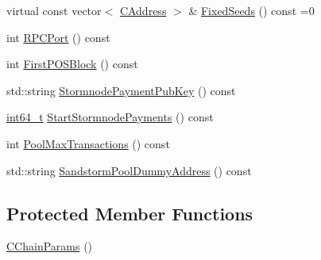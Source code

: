\begin{DoxyCompactItemize}
virtual const vector$<$ \hyperlink{class_c_address}{C\+Address} $>$ \& \hyperlink{class_c_chain_params_a9e09b643284669c2769663efe23488fb}{Fixed\+Seeds} () const =0
\item 
int \hyperlink{class_c_chain_params_ac6f1379c1948312e9577449e967d5224}{R\+P\+C\+Port} () const 
\item 
int \hyperlink{class_c_chain_params_a3cffb9a755e132d5f175bca6448fd13e}{First\+P\+O\+S\+Block} () const 
\item 
std\+::string \hyperlink{class_c_chain_params_af573655162ed0d9790bbf575e0f955b2}{Stormnode\+Payment\+Pub\+Key} () const 
\item 
\hyperlink{stdint_8h_adec1df1b8b51cb32b77e5b86fff46471}{int64\+\_\+t} \hyperlink{class_c_chain_params_a14a73174e170f4b7a1f26f5a62db806c}{Start\+Stormnode\+Payments} () const 
\item 
int \hyperlink{class_c_chain_params_ad5007b0f28cac385aa2a8eece0e750d2}{Pool\+Max\+Transactions} () const 
\item 
std\+::string \hyperlink{class_c_chain_params_a9c01d3c72ab253ec4c2808fcb38cb1f0}{Sandstorm\+Pool\+Dummy\+Address} () const 
\end{DoxyCompactItemize}
\subsection*{Protected Member Functions}
\begin{DoxyCompactItemize}
\item 
\hyperlink{class_c_chain_params_a8d07fce73d4160244459c5aaae8fb966}{C\+Chain\+Params} ()
\end{DoxyCompactItemize}
